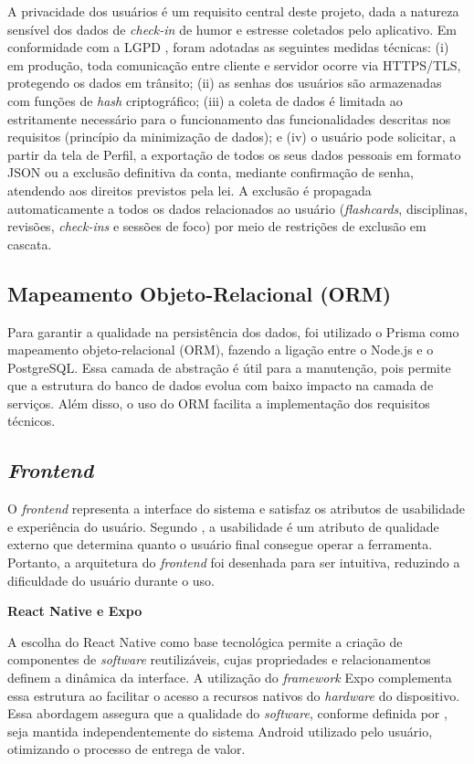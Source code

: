 A privacidade dos usuários é um requisito central deste projeto, dada a natureza sensível dos dados de \textit{check-in} de humor e estresse coletados pelo aplicativo.
Em conformidade com a LGPD \cite{brasil2018lgpd}, foram adotadas as seguintes medidas técnicas: (i) em produção, toda comunicação entre cliente e servidor ocorre via HTTPS/TLS, protegendo os dados em trânsito; (ii) as senhas dos usuários são armazenadas com funções de \textit{hash} criptográfico; (iii) a coleta de dados é limitada ao estritamente necessário para o funcionamento das funcionalidades descritas nos requisitos (princípio da minimização de dados); e (iv) o usuário pode solicitar, a partir da tela de Perfil, a exportação de todos os seus dados pessoais em formato JSON ou a exclusão definitiva da conta, mediante confirmação de senha, atendendo aos direitos previstos pela lei.
A exclusão é propagada automaticamente a todos os dados relacionados ao usuário (\textit{flashcards}, disciplinas, revisões, \textit{check-ins} e sessões de foco) por meio de restrições de exclusão em cascata.

\subsection{Mapeamento Objeto-Relacional (ORM)}

Para garantir a qualidade na persistência dos dados, foi utilizado o Prisma como mapeamento objeto-relacional (ORM), fazendo a ligação entre o Node.js e o PostgreSQL.
Essa camada de abstração é útil para a manutenção, pois permite que a estrutura do banco de dados evolua com baixo impacto na camada de serviços.
Além disso, o uso do ORM facilita a implementação dos requisitos técnicos.

\subsection{\textit{Frontend}}

O \textit{frontend} representa a interface do sistema e satisfaz os atributos de usabilidade e experiência do usuário.
Segundo , a usabilidade é um atributo de qualidade externo que determina quanto o usuário final consegue operar a ferramenta.
Portanto, a arquitetura do \textit{frontend} foi desenhada para ser intuitiva, reduzindo a dificuldade do usuário durante o uso.

\textbf{React Native e Expo}

A escolha do React Native como base tecnológica permite a criação de componentes de \textit{software} reutilizáveis, cujas propriedades e relacionamentos definem a dinâmica da interface.
A utilização do \textit{framework} Expo complementa essa estrutura ao facilitar o acesso a recursos nativos do \textit{hardware} do dispositivo.
Essa abordagem assegura que a qualidade do \textit{software}, conforme definida por , seja mantida independentemente do sistema Android utilizado pelo usuário, otimizando o processo de entrega de valor.

